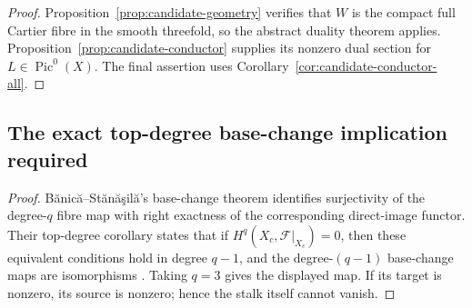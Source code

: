 

\begin{proof}
Proposition~\ref{prop:candidate-geometry} verifies that $W$ is the compact
full Cartier fibre in the smooth threefold, so the abstract duality theorem
applies.  Proposition~\ref{prop:candidate-conductor} supplies its nonzero
dual section for $L\in\operatorname{Pic}^0(X)$.  The final assertion uses
Corollary~\ref{cor:candidate-conductor-all}.
\end{proof}

\subsection{The exact top-degree base-change implication required}


\begin{proof}
B\u{a}nic\u{a}--St\u{a}n\u{a}\c{s}il\u{a}'s base-change theorem identifies
surjectivity of the degree-$q$ fibre map with right exactness of the
corresponding direct-image functor.  Their top-degree corollary states that
if $H^q(X_c,\mathcal F|_{X_c})=0$, then these equivalent conditions hold in
degree $q-1$, and the degree-$(q-1)$ base-change maps are isomorphisms
\cite[Chapter~III, \S3, Theorem~3.4 and Corollary~3.5,
pp.~116--121]{BanicaStanasila1976}.  Taking $q=3$ gives the displayed map.
If its target is nonzero, its source is nonzero; hence the stalk itself
cannot vanish.
\end{proof}


